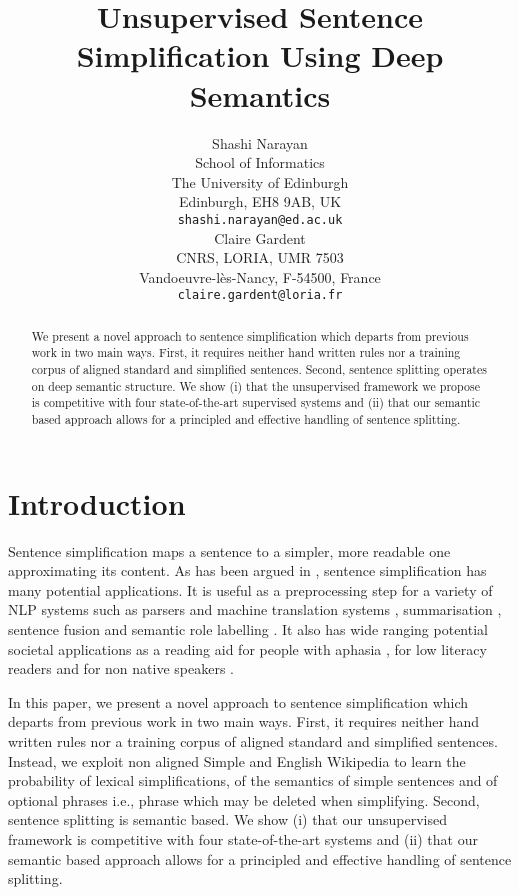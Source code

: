 \documentclass[11pt,a4paper]{article}
\title{Unsupervised Sentence Simplification Using Deep Semantics}
\author{Shashi Narayan\\
School of Informatics\\
The University of Edinburgh\\
Edinburgh, EH8 9AB, UK\\
{\tt shashi.narayan@ed.ac.uk} \\\And
Claire Gardent\\
CNRS, LORIA, UMR 7503\\
Vandoeuvre-l\`es-Nancy, F-54500, France\\
{\tt claire.gardent@loria.fr}}
\begin{document}
\maketitle
\begin{abstract}

We present a novel approach to sentence simplification which departs
from previous work in two main ways. First, it requires neither hand
written rules nor a training corpus of aligned standard and simplified
sentences. Second, sentence splitting operates on deep semantic
structure. We show (i) that the unsupervised framework we propose is
competitive with four state-of-the-art supervised systems and (ii)
that our semantic based approach allows for a principled and effective
handling of sentence splitting.


\end{abstract}

\section{Introduction}
\label{sec:introduction}

Sentence simplification maps a sentence to a simpler, more readable
one approximating its content.
As has been argued in \cite{shardlow2014survey},
sentence simplification has many potential applications. It is useful
as a preprocessing step for a variety of NLP systems such as parsers
and machine translation systems \cite{chandrasekar1996motivations},
summarisation \cite{knight2000statistics}, sentence fusion
\cite{filippova2008dependency} and semantic role labelling
\cite{vickrey2008sentence}. It also has wide ranging potential
societal applications as a reading aid for people with aphasia
\cite{carroll1999simplifying}, for low literacy readers
\cite{watanabe2009facilita} and for non native speakers
\cite{siddharthan2002architecture}.


In this paper, we present a novel approach to sentence simplification
which departs from previous work in two main ways.  First, it requires
neither hand written rules nor a training corpus of aligned standard
and simplified sentences. Instead, we exploit non aligned Simple and
English Wikipedia to learn the probability of lexical simplifications,
of the semantics of simple sentences and of optional phrases i.e.,
phrase which may be deleted when simplifying.  Second, sentence
splitting is semantic based.  We show (i) that our unsupervised
framework is competitive with four state-of-the-art systems and (ii)
that our semantic based approach allows for a principled and effective
handling of sentence splitting.
\end{document}
